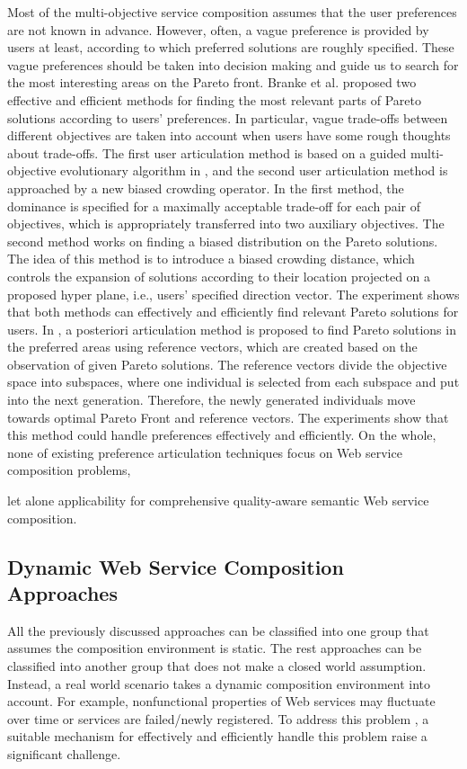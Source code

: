 Most of the multi-objective service composition assumes that the user preferences are not known in advance. However,  often, a vague preference is provided by users at least, according to which preferred solutions are roughly specified.  These vague preferences should be taken into decision making and guide us to search for the most interesting areas on the Pareto front. Branke et al. \cite{branke2005integrating} proposed two effective and efficient methods for finding the most relevant parts of Pareto solutions according to users' preferences. In particular, vague trade-offs between different objectives are taken into account when users have some rough thoughts about trade-offs.  The first user articulation method is based on a guided multi-objective evolutionary algorithm in \cite{branke2001guidance}, and the second user articulation method is approached by a new biased crowding operator. In the first method, the dominance is specified for a maximally acceptable trade-off for each pair of objectives, which is appropriately transferred into two auxiliary objectives. The second method works on finding a biased distribution on the Pareto solutions. The idea of this method is to introduce a biased crowding distance, which controls the expansion of solutions according to their location projected on a proposed hyper plane, i.e., users' specified direction vector.  The experiment shows that both methods can effectively and efficiently find relevant Pareto solutions for users. In \cite{cheng2015reference}, a posteriori articulation method is proposed to find Pareto solutions in the preferred areas using reference vectors, which are created based on the observation of given Pareto solutions. The reference vectors divide the objective space into subspaces, where one individual is selected from each subspace and put into the next generation. Therefore, the newly generated individuals move towards optimal Pareto Front and reference vectors. The experiments show that this method could handle preferences effectively and efficiently. On the whole, none of existing preference articulation techniques focus on Web service composition problems, 


let alone applicability for comprehensive quality-aware semantic Web service composition. 



\subsection{Dynamic Web Service Composition Approaches}\label{dynamicserivce}
All the previously discussed approaches can be classified into one group that assumes the composition environment is static. The rest approaches can be classified into another group that does not make a closed world assumption. Instead, a real world scenario takes a dynamic composition environment into account. For example, nonfunctional properties of Web services may fluctuate over time or services are failed/newly registered. To address this problem \cite{nasridinov2012qos},  a suitable mechanism for effectively and efficiently handle this problem raise a significant challenge.

